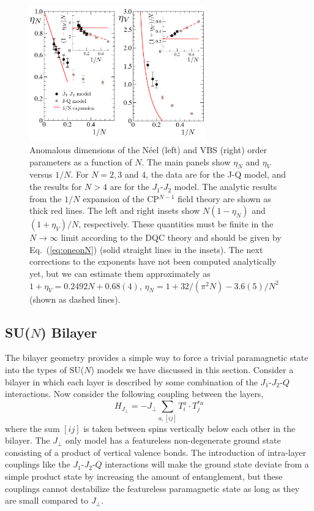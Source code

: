 \documentclass[aps,prb,groupedaddress,twocolumn]{revtex4}
\begin{document}
\begin{figure}
\includegraphics[width=3.0in]{fig_exp.pdf}
  \caption{ \label{fig:exp} Anomalous dimensions of the N\'eel (left)
    and VBS (right)
  order parameters as a function of $N$. The main panels show $\eta_N$ and $\eta_V$ versus $1/N$. For $N=2,3$ and $4$, the data are 
  for the J-Q model, and the results for $N>4$ are for the $J_1$-$J_2$ model. The analytic results 
  from the $1/N$ expansion of the CP$^{N-1}$ field theory are shown as thick red lines. The left and right insets 
  show $N(1-\eta_N)$ and $(1+\eta_V)/N$, respectively. These quantities must be finite in the  $N\rightarrow \infty$ 
  limit according to the DQC theory and should be given by Eq.~(\ref{eq:oneonN}) (solid straight lines in the insets). 
  The next corrections to the exponents have not been computed analytically yet, but we can estimate them approximately 
  as $1+\eta_V = 0.2492 N + 0.68(4)$, $\eta_N = 1+32/(\pi^2 N)-3.6(5)/N^2$ (shown as dashed lines).}
\end{figure}

\subsection{SU($N$) Bilayer}
\label{ss:bilN}

The bilayer geometry provides a simple way to force a trivial paramagnetic
state into the types of SU($N$) models we have discussed in this
section. Consider a bilayer in which each layer is described by some
combination of the $J_1$-$J_2$-$Q$ interactions. Now consider the
following coupling between the layers,
\begin{equation}
 H_{J_\perp} = -J_\perp \sum_{a,[ij]} T^a_i\cdot T^{*a}_j
\end{equation}
where the sum $[ij]$ is taken between spins vertically below each other
in the bilayer. The $J_\perp$ only model has a featureless non-degenerate ground state
consisting of a product of vertical valence bonds. The introduction of intra-layer couplings like the $J_1$-$J_2$-$Q$ interactions will
make the ground state deviate from a simple product state by
increasing the amount of entanglement, but these couplings
 cannot destabilize the featureless paramagnetic
state as long as they are small compared to $J_\perp$. 
\end{document}
